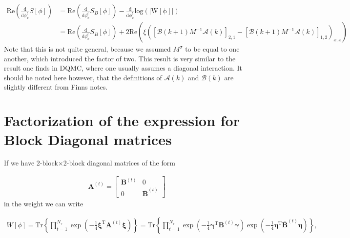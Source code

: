 \documentclass{article}
\begin{document}
\begin{align}
	\mathrm{Re} \left(\frac{\mathrm{d} }{\mathrm{d}\phi_{x}^{t} } S[\phi] \right) &= \mathrm{Re} \left(\frac{\mathrm{d} }{\mathrm{d}\phi_{x}^{t} }  S_B[\phi] \right) - \frac{\mathrm{d} }{\mathrm{d}\phi_{x}^{t} }\mathrm{log\left(|W[\phi]|\right) }  \nonumber \\
	&= \mathrm{Re} \left(\frac{\mathrm{d} }{\mathrm{d}\phi_{x}^{t} }  S_B[\phi] \right) + 2\mathrm{Re}\left(  \xi  \left(\left[\mathcal{B}\left(k+1\right)M^{-1} \mathcal{A}\left(k\right)\right]_{2,1} - \left[\mathcal{B}\left(k+1\right)M^{-1} \mathcal{A}\left(k\right)\right]_{1,2}  \right)_{x,x}  \right)
\end{align}
Note that this is not quite general, because we assumed $M^{\sigma}$ to be equal to one another, which introduced the factor of two. 
This result is very similar to the result one finds in DQMC, where one usually assumes a diagonal interaction. It should be noted here however, that the definitions of $\mathcal{A}(k)$ and $\mathcal{B}(k)$ are slightly different from Finns notes.







	
	
\appendix
	
\section{Factorization of the expression for Block Diagonal matrices \label{blocks}}


If we have 2-block$\times$2-block diagonal matrices of the form

\begin{align}
	\boldsymbol{A}^{(t)} = \begin{bmatrix}
		\boldsymbol{B}^{(t)} & 0 \\
		0 & \boldsymbol{\bar{B}}^{(t)}  
	\end{bmatrix}
\end{align}in the weight we can write

\begin{align}
	W[\phi]= \mathrm{Tr} \left\{\prod_{t=1}^{N_\tau}
	\exp \left( -\frac{1}{4}\boldsymbol{\xi}^\mathrm{T} \boldsymbol{A}^{(t)} \boldsymbol{\xi}    \right)  \right\}
	=\mathrm{Tr} \left\{\prod_{t=1}^{N_\tau}\exp \left( -\frac{1}{4}\boldsymbol{\gamma}^\mathrm{T} \boldsymbol{B}^{(t)}\boldsymbol{\gamma}  \right) 
	\exp \left( -\frac{1}{4}\boldsymbol{\eta}^\mathrm{T} \bar{\boldsymbol{B}}^{(t)}\boldsymbol{\eta}  \right)  \right\} ,
\end{align}
	
\end{document}
